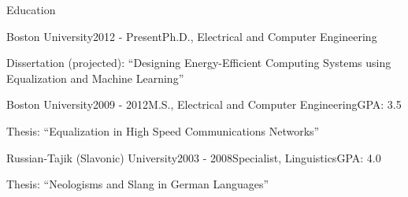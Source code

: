 \begin {rSection} {Education}
  \begin{rSubsection}{Boston University}{2012 - Present}{Ph.D., Electrical and Computer Engineering}{}
  \item Dissertation (projected): ``Designing Energy-Efficient Computing Systems using Equalization and Machine Learning''
  \end{rSubsection}
  \begin{rSubsection}{Boston University}{2009 - 2012}{M.S., Electrical and Computer Engineering}{GPA: 3.5}
  \item Thesis: ``Equalization in High Speed Communications Networks''
  \end{rSubsection}
  \begin{rSubsection}{Russian-Tajik (Slavonic) University}{2003 - 2008}{Specialist, Linguistics}{GPA: 4.0}
  \item Thesis: ``Neologisms and Slang in German Languages''
  \end{rSubsection}
\end{rSection}
